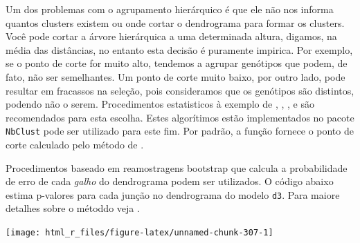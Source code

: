 \documentclass[
]{book}
\newenvironment{Shaded}{\begin{snugshade}}{\end{snugshade}}
\newcommand{\CommentTok}[1]{\textcolor[rgb]{0.56,0.35,0.01}{\textit{#1}}}
\newcommand{\DataTypeTok}[1]{\textcolor[rgb]{0.13,0.29,0.53}{#1}}
\newcommand{\DecValTok}[1]{\textcolor[rgb]{0.00,0.00,0.81}{#1}}
\newcommand{\FloatTok}[1]{\textcolor[rgb]{0.00,0.00,0.81}{#1}}
\newcommand{\KeywordTok}[1]{\textcolor[rgb]{0.13,0.29,0.53}{\textbf{#1}}}
\newcommand{\NormalTok}[1]{#1}
\newcommand{\OperatorTok}[1]{\textcolor[rgb]{0.81,0.36,0.00}{\textbf{#1}}}
\newcommand{\StringTok}[1]{\textcolor[rgb]{0.31,0.60,0.02}{#1}}
\begin{document}
Um dos problemas com o agrupamento  hierárquico é que ele não nos informa quantos clusters existem ou onde cortar o dendrograma  para formar os clusters. Você pode cortar a árvore hierárquica a uma determinada altura, digamos, na média das distâncias, no entanto esta decisão é puramente impirica. Por exemplo, se o ponto de corte for muito alto, tendemos a agrupar genótipos que podem, de fato, não ser semelhantes. Um ponto de corte muito baixo, por outro lado, pode resultar em fracassos na seleção, pois consideramos que os genótipos são distintos, podendo não o serem. Procedimentos estatisticos à exemplo de \citet{Milligan1985}, \citet{Scott1971}, \citet{Krzanowski1988}, \citet{Halkidi2001} e \citet{Hubert1985} são recomendados para esta escolha. Estes algorítimos estão implementados no pacote \texttt{NbClust} \citep{Charrad2014} pode ser utilizado para este fim. Por padrão, a função fornece o ponto de corte calculado pelo método de \citet{Mojena1977}.

Procedimentos baseado em reamostragens bootstrap que calcula a probabilidade de erro de cada \emph{galho} do dendrograma  podem ser utilizados. O código abaixo estima p-valores para cada junção no dendrograma do modelo \texttt{d3}. Para maiore detalhes sobre o métoddo veja \citet{Suzuki2006}.

\begin{Shaded}
\end{Shaded}

\begin{center}\texttt{[image: html\_r\_files/figure-latex/unnamed-chunk-307-1]} \end{center}
\end{document}
